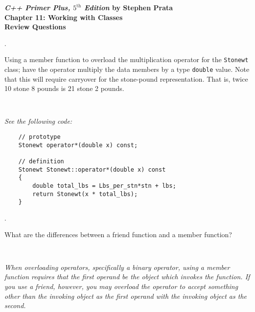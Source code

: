 \documentclass{amsart}
\begin{document}
\begin{center}
	\Large {\bfseries
	\emph{C++ Primer Plus, $5^{\text{th}}$ Edition} by Stephen Prata \\
	Chapter 11: Working with Classes \\
	Review Questions} \normalsize \vspace{5ex}
\end{center}


\phantom{\quad}
\vfill
{}. 
\begin{minipage}[t]{11.5 cm}
	Using a member function to overload the multiplication operator for the \texttt{Stonewt} class; have the operator multiply the data members by a type \texttt{double} value. Note that this will require carryover for the stone-pound representation. That is, twice 10 stone 8 pounds is 21 stone 2 pounds. 
\end{minipage} \\[1ex]
\phantom{3. } 
\begin{minipage}[t]{11.5 cm}
	{\slshape 
	See the following code:
	} 
	\begin{verbatim}
	// prototype
	Stonewt operator*(double x) const;

	// definition
	Stonewt Stonewt::operator*(double x) const
	{
	    double total_lbs = Lbs_per_stn*stn + lbs;
	    return Stonewt(x * total_lbs);
	}
	\end{verbatim}
\end{minipage} 
\vfill

. 
\begin{minipage}[t]{11.5 cm}
	What are the differences between a friend function and a member function?
\end{minipage} \\[1ex]
\phantom{2. } 
\begin{minipage}[t]{11.5 cm}
	{\slshape 
	When overloading operators, specifically a binary operator, using 
	a member function requires that the first operand be
	the object which invokes the function.
	If you use a friend, however, you may overload the 
	operator to accept something other than the invoking 
	object as the first operand with the invoking object
	as the second. 
	} 
\end{minipage} 
\vfill
\end{document}

